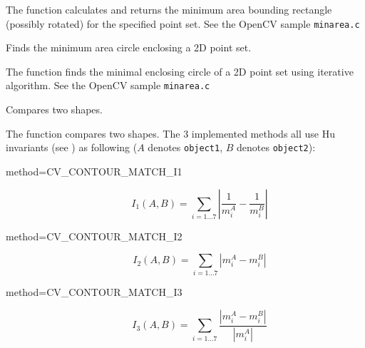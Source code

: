The function calculates and returns the minimum area bounding rectangle (possibly rotated) for the specified point set. See the OpenCV sample \texttt{minarea.c}

Finds the minimum area circle enclosing a 2D point set.

\begin{description}
\end{description}

The function finds the minimal enclosing circle of a 2D point set using iterative algorithm. See the OpenCV sample \texttt{minarea.c}

Compares two shapes.

\begin{description}
\end{description}

The function compares two shapes. The 3 implemented methods all use Hu invariants (see ) as following ($A$ denotes \texttt{object1}, $B$ denotes \texttt{object2}):

\begin{description}
\item[method=CV\_CONTOUR\_MATCH\_I1]
\[ I_1(A,B) = \sum_{i=1...7} \left| \frac{1}{m^A_i} - \frac{1}{m^B_i} \right| \]

\item[method=CV\_CONTOUR\_MATCH\_I2]
\[ I_2(A,B) = \sum_{i=1...7} \left| m^A_i - m^B_i \right| \]

\item[method=CV\_CONTOUR\_MATCH\_I3]
\[ I_3(A,B) = \sum_{i=1...7} \frac{ \left| m^A_i - m^B_i \right| }{ \left| m^A_i \right| } \]
\end{description}

